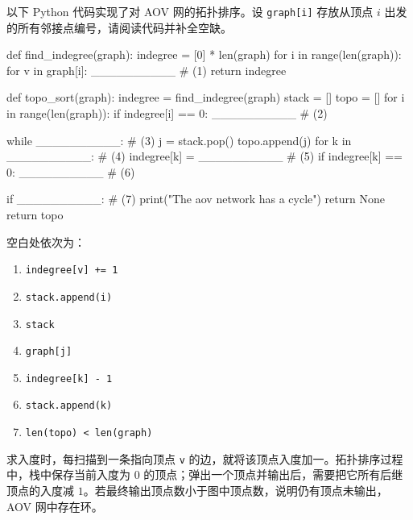 \begin{question}
以下 Python 代码实现了对 AOV 网的拓扑排序。设 \texttt{graph[i]} 存放从顶点 $i$ 出发的所有邻接点编号，请阅读代码并补全空缺。
\begin{pycode}
def find_indegree(graph):
    indegree = [0] * len(graph)
    for i in range(len(graph)):
        for v in graph[i]:
            __________                         # (1)
    return indegree


def topo_sort(graph):
    indegree = find_indegree(graph)
    stack = []
    topo = []
    for i in range(len(graph)):
        if indegree[i] == 0:
            __________                         # (2)

    while __________:                          # (3)
        j = stack.pop()
        topo.append(j)
        for k in __________:                   # (4)
            indegree[k] = __________           # (5)
            if indegree[k] == 0:
                __________                     # (6)

    if __________:                             # (7)
        print("The aov network has a cycle")
        return None
    return topo
\end{pycode}
\begin{solution}
空白处依次为：
\begin{enumerate}
  \item \texttt{indegree[v] += 1}
  \item \texttt{stack.append(i)}
  \item \texttt{stack}
  \item \texttt{graph[j]}
  \item \texttt{indegree[k] - 1}
  \item \texttt{stack.append(k)}
  \item \texttt{len(topo) < len(graph)}
\end{enumerate}
求入度时，每扫描到一条指向顶点 \texttt{v} 的边，就将该顶点入度加一。拓扑排序过程中，栈中保存当前入度为 $0$ 的顶点；弹出一个顶点并输出后，需要把它所有后继顶点的入度减 $1$。若最终输出顶点数小于图中顶点数，说明仍有顶点未输出，AOV 网中存在环。
\end{solution}
\end{question}


